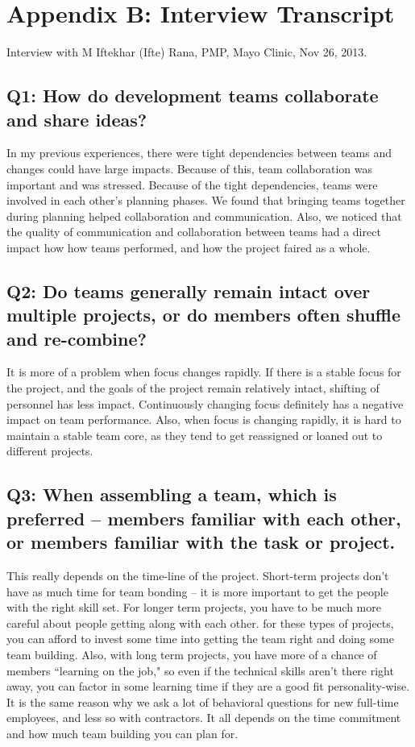 \clearpage

\section*{Appendix B: Interview Transcript}
Interview with M Iftekhar (Ifte) Rana, PMP\textregistered, Mayo Clinic, Nov 26, 2013.

\subsection*{Q1: How do development teams collaborate and share ideas?}
In my previous experiences, there were tight dependencies between teams and changes could have large impacts. Because of this, team collaboration was important and was stressed. Because of the tight dependencies, teams were involved in each other's planning phases. We found that bringing teams together during planning helped collaboration and communication. Also, we noticed that the quality of communication and collaboration between teams had a direct impact how how teams performed, and how the project faired as a whole.


\subsection*{Q2: Do teams generally remain intact over multiple projects, or do members often shuffle and re-combine?}
It is more of a problem when focus changes rapidly. If there is a stable focus for the project, and the goals of the project remain relatively intact, shifting of personnel has less impact. Continuously changing focus definitely has a negative impact on team performance. Also, when focus is changing rapidly, it is hard to maintain a stable team core, as they tend to get reassigned or loaned out to different projects.


\subsection*{Q3: When assembling a team, which is preferred -- members familiar with each other, or members familiar with the task or project.}
This really depends on the time-line of the project. Short-term projects don't have as much time for team bonding -- it is more important to get the people with the right skill set. For longer term projects, you have to be much more careful about people getting along with each other. for these types of projects, you can afford to invest some time into getting the team right and doing some team building. Also, with long term projects, you have more of a chance of members ``learning on the job," so even if the technical skills aren't there right away, you can factor in some learning time if they are a good fit personality-wise. It is the same reason why we ask a lot of behavioral questions for new full-time employees, and less so with contractors. It all depends on the time commitment and how much team building you can plan for.


